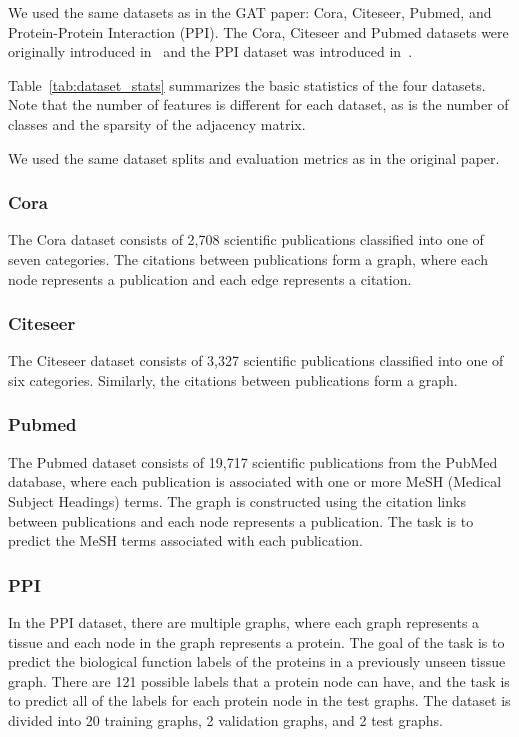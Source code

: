 We used the same datasets as in the GAT paper: Cora, Citeseer, Pubmed, and Protein-Protein Interaction (PPI).
The Cora, Citeseer and Pubmed datasets were originally introduced in~\cite{sen2008collective} and the PPI dataset was
introduced in~\cite{hamilton2017inductive}.

Table~\ref{tab:dataset_stats} summarizes the basic statistics of the four datasets.
Note that the number of features is different for each dataset, as is the number of classes and the sparsity of the adjacency matrix.

We used the same dataset splits and evaluation metrics as in the original paper.

\subsubsection{Cora}
The Cora dataset consists of 2,708 scientific publications classified into one of seven categories.
The citations between publications form a graph, where each node represents a publication and each edge represents a citation.

\subsubsection{Citeseer}
The Citeseer dataset consists of 3,327 scientific publications classified into one of six categories.
Similarly, the citations between publications form a graph.

\subsubsection{Pubmed}
The Pubmed dataset consists of 19,717 scientific publications from the PubMed database, where each publication is associated with one or more MeSH (Medical Subject Headings) terms.
The graph is constructed using the citation links between publications and each node represents a publication.
The task is to predict the MeSH terms associated with each publication.

\subsubsection{PPI}
In the PPI dataset, there are multiple graphs, where each graph represents a tissue and each node in the graph represents a protein.
The goal of the task is to predict the biological function labels of the proteins in a previously unseen tissue graph.
There are 121 possible labels that a protein node can have, and the task is to predict all of the labels for each protein node in the test graphs.
The dataset is divided into 20 training graphs, 2 validation graphs, and 2 test graphs.

